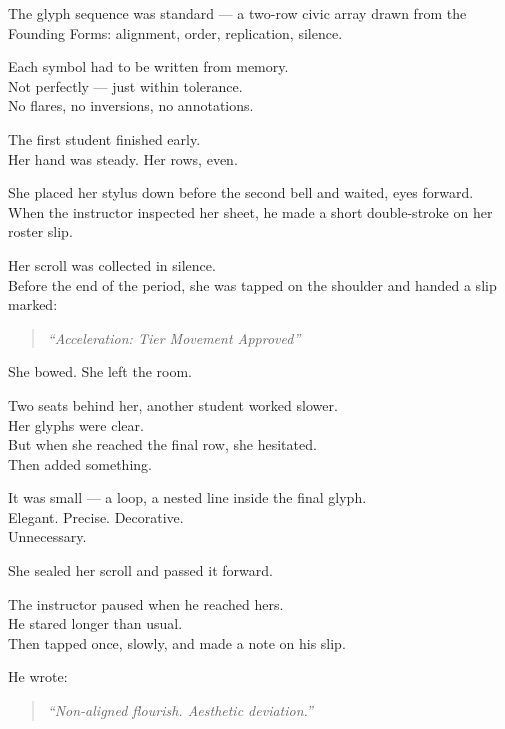 \documentclass[9pt]{article}
\begin{document}
The glyph sequence was standard — a two-row civic array drawn from the Founding Forms: alignment, order, replication, silence.

Each symbol had to be written from memory.\\
Not perfectly — just within tolerance.\\
No flares, no inversions, no annotations.

\vspace{1em}

The first student finished early.\\
Her hand was steady. Her rows, even.

She placed her stylus down before the second bell and waited, eyes forward.\\
When the instructor inspected her sheet, he made a short double-stroke on her roster slip.

Her scroll was collected in silence.\\
Before the end of the period, she was tapped on the shoulder and handed a slip marked:

\begin{quote}
\textit{“Acceleration: Tier Movement Approved”}
\end{quote}

She bowed. She left the room.

\vspace{1em}

Two seats behind her, another student worked slower.\\
Her glyphs were clear.\\
But when she reached the final row, she hesitated.\\
Then added something.

It was small — a loop, a nested line inside the final glyph.\\
Elegant. Precise. Decorative.\\
Unnecessary.

She sealed her scroll and passed it forward.

The instructor paused when he reached hers.\\
He stared longer than usual.\\
Then tapped once, slowly, and made a note on his slip.

He wrote:

\begin{quote}
\textit{“Non-aligned flourish. Aesthetic deviation.”}
\end{quote}
\end{document}
